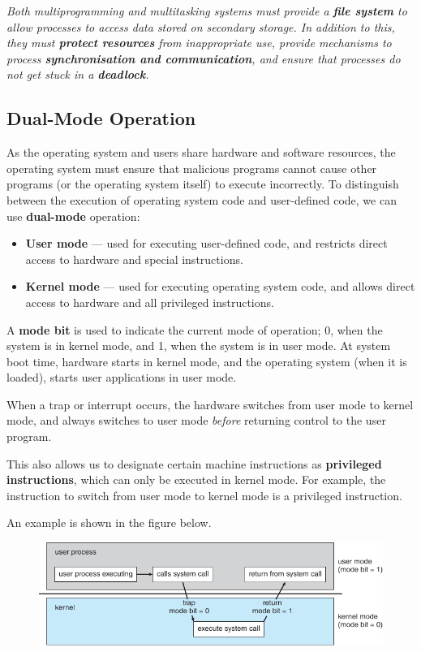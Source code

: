 \documentclass{article}
\begin{document}
\emph{Both multiprogramming and multitasking systems must provide a
    \textbf{file system} to allow processes to access data stored on
    secondary storage. In addition to this, they must \textbf{protect
        resources} from inappropriate use, provide mechanisms to process
    \textbf{synchronisation and communication}, and ensure that
    processes do not get stuck in a \textbf{deadlock}.
}
\subsection{Dual-Mode Operation}
As the operating system and users share hardware and software
resources, the operating system must ensure that malicious programs
cannot cause other programs (or the operating system itself) to execute
incorrectly. To distinguish between the execution of operating system
code and user-defined code, we can use \textbf{dual-mode} operation:
\begin{itemize}
    \item \textbf{User mode} --- used for executing
          user-defined code, and restricts direct access to hardware and
          special instructions.
    \item \textbf{Kernel mode} --- used for executing operating system
          code, and allows direct access to hardware and all privileged
          instructions.
\end{itemize}
A \textbf{mode bit} is used to indicate the current mode of operation;
0, when the system is in kernel mode, and 1, when the system is in
user mode.
At system boot time, hardware starts in kernel mode, and the operating
system (when it is loaded), starts user applications in user mode.

When a trap or interrupt occurs, the hardware switches from user mode
to kernel mode, and always switches to user mode \textit{before}
returning control to the user program.

This also allows us to designate certain machine instructions as
\textbf{privileged instructions}, which can only be executed in kernel
mode. For example, the instruction to switch from user mode to kernel
mode is a privileged instruction.

An example is shown in the figure below.
\begin{figure}[H]
    \centering
    \includegraphics[width = \linewidth]{figures/dual_mode.pdf}
\end{figure}
\end{document}

